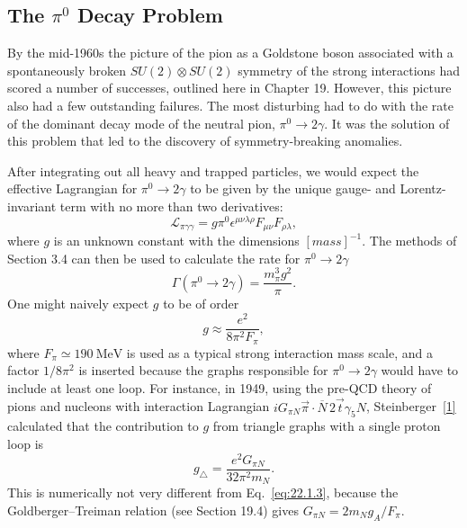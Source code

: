\subsection{\texorpdfstring{The $\pi^0$ Decay Problem}{The pi0 Decay Problem}}
\label{sec:22.1}

By the mid-1960s the picture of the pion as a Goldstone boson associated
with a spontaneously broken $SU(2)\otimes SU(2)$ symmetry of the strong
interactions had scored a number of successes, outlined here in Chapter 19.
However, this picture also had a few outstanding failures. The most
disturbing had to do with the rate of the dominant decay mode of the neutral
pion, $\pi^0\to2\gamma$. It was the solution of this problem that led to the
discovery of symmetry-breaking anomalies.

After integrating out all heavy and trapped particles, we would expect the
effective Lagrangian for $\pi^0\to2\gamma$ to be given by the unique gauge-
and Lorentz-invariant term with no more than two derivatives:
\begin{equation}
 \mathcal L_{\pi\gamma\gamma}
 =g\pi^0\epsilon^{\mu\nu\lambda\rho}F_{\mu\nu}F_{\rho\lambda},
 \tag{22.1.1}\label{eq:22.1.1}
\end{equation}
where $g$ is an unknown constant with the dimensions $[\mathit{mass}]^{-1}$.
The methods of Section 3.4 can then be used to calculate the rate for
$\pi^0\to2\gamma$
\begin{equation}
 \Gamma(\pi^0\to2\gamma)=\frac{m_\pi^3g^2}{\pi}.
 \tag{22.1.2}\label{eq:22.1.2}
\end{equation}
One might naively expect $g$ to be of order
\begin{equation}
 g\approx\frac{e^2}{8\pi^2F_\pi},
 \tag{22.1.3}\label{eq:22.1.3}
\end{equation}
where $F_\pi\simeq190\ \mathrm{MeV}$ is used as a typical strong interaction
mass scale, and a factor $1/8\pi^2$ is inserted because the graphs
responsible for $\pi^0\to2\gamma$ would have to include at least one loop.
For instance, in 1949, using the pre-QCD theory of pions and nucleons with
interaction Lagrangian
$iG_{\pi N}\vec\pi\cdot\overline N\,2\vec t\gamma_5N$,
Steinberger~\hyperref[ch22-ref-1]{[1]} calculated that the contribution to
$g$ from triangle graphs with a single proton loop is
\begin{equation}
 g_\triangle=\frac{e^2G_{\pi N}}{32\pi^2m_N}.
 \tag{22.1.4}\label{eq:22.1.4}
\end{equation}
This is numerically not very different from Eq.~\eqref{eq:22.1.3}, because
the Goldberger--Treiman relation (see Section 19.4) gives
$G_{\pi N}=2m_Ng_A/F_\pi$.

